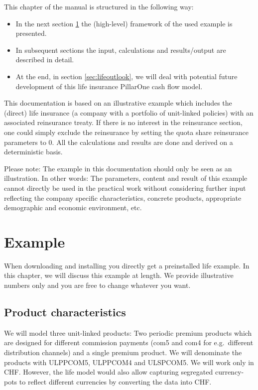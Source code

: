This chapter of the manual is structured in the following way:
\begin{itemize}
	\item In the next section \ref{sec:lifeexample} the (high-level) framework of the used example is presented.
	\item In subsequent sections the input, calculations and results/output are described in detail.
	\item At the end, in section \ref{sec:lifeoutlook}, we will deal with potential future development of this life insurance PillarOne cash flow model.
\end{itemize}

This documentation is based on an illustrative example which includes the (direct) life insurance (a company with a portfolio of unit-linked policies) with an associated reinsurance treaty. If there is no interest in the reinsurance section, one could simply exclude the reinsurance by setting the quota share reinsurance parameters to 0. All the calculations and results are done and derived on a deterministic basis. 

Please note: The example in this documentation should only be seen as an illustration. In other words: The parameters, content and result of this example cannot directly be used in the practical work without considering further input reflecting the company specific characteristics, concrete products, appropriate demographic and economic environment, etc.

\section{Example}\label{sec:lifeexample}

When downloading and installing \RA{} you directly get a preinstalled life example. In this chapter, we will discuss this example at length. We provide illustrative numbers only and you are free to change whatever you want. 

\subsection{Product characteristics}
We will model three unit-linked products: Two periodic premium products which are designed for different commission payments (com5 and com4 for e.g.~different distribution channels) and a single premium product. We will denominate the products with ULPPCOM5, ULPPCOM4 and ULSPCOM5. We will work only in CHF. However, the life model would also allow capturing segregated currency-pots to reflect different currencies by converting the data into CHF.

